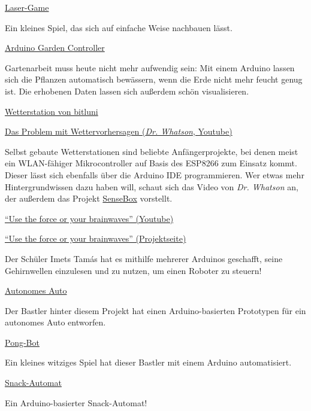 \vfill
\begin{links}
	\item \href{https://www.instructables.com/id/Arduino-UNO-Laser-Game/}{Laser-Game}
	
	Ein kleines Spiel, das sich auf einfache Weise nachbauen lässt.
	
	\item \href{https://www.youtube.com/watch?v=O_Q1WKCtWiA}{Arduino Garden Controller}
	
	Gartenarbeit muss heute nicht mehr aufwendig sein: Mit einem Arduino lassen sich die Pflanzen automatisch bewässern, wenn die Erde nicht mehr feucht genug ist. Die erhobenen Daten lassen sich außerdem schön visualisieren.
	
	\item \href{https://www.youtube.com/watch?v=at7wmm9t8UE}{Wetterstation von bitluni}
	
	\href{https://www.youtube.com/watch?v=aHkec8bA8iI}{Das Problem mit Wettervorhersagen (\emph{Dr. Whatson}, Youtube)}
	
	Selbst gebaute Wetterstationen sind beliebte Anfängerprojekte, bei denen meist ein WLAN-fähiger Mikrocontroller auf Basis des ESP8266 zum Einsatz kommt. Dieser lässt sich ebenfalls über die Arduino IDE programmieren. Wer etwas mehr Hintergrundwissen dazu haben will, schaut sich das Video von \emph{Dr. Whatson} an, der außerdem das Projekt \href{https://www.sensebox.de/}{SenseBox} vorstellt.
	
	\item \href{https://www.youtube.com/watch?v=KtSCo6hIlRQ}{\enquote{Use the force or your brainwaves} (Youtube)}
	
	\href{https://create.arduino.cc/projecthub/Imetomi/use-the-force-or-your-brainwaves-9e839b}{\enquote{Use the force or your brainwaves} (Projektseite)}
	
	Der Schüler Imets Tamás hat es mithilfe mehrerer Arduinos geschafft, seine Gehirnwellen einzulesen und zu nutzen, um einen Roboter zu steuern!

	\item \href{https://www.instructables.com/id/Self-Driving-Car-Using-Arduinoautonomous-Guided-Ve/}{Autonomes Auto}
	
	Der Bastler hinter diesem Projekt hat einen Arduino-basierten Prototypen für ein autonomes Auto entworfen.
	
	\item \href{https://www.instructables.com/id/Arduino-Controlled-Game-Pong-Bot-Vs-Human/}{Pong-Bot}
	
	Ein kleines witziges Spiel hat dieser Bastler mit einem Arduino automatisiert.
	
	\item \href{https://www.instructables.com/id/Snack-Vending-Machine-Powered-by-Arduino/}{Snack-Automat}
	
	Ein Arduino-basierter Snack-Automat!
\end{links}